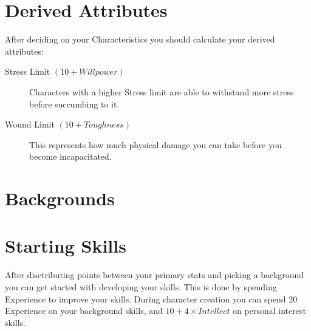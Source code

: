 
\section{Derived Attributes}

After deciding on your Characteristics you should calculate your derived attributes:

\begin{description}
    \item[Stress Limit $(10 + Willpower)$] 
    Characters with a higher Stress limit are able to withstand more stress before succumbing to it.
    \item[Wound Limit $(10 + Toughness)$] 
    This represents how much physical damage you can take before you become incapacitated.
\end{description}



\section{Backgrounds}

\section{Starting Skills}
After disctributing points between your primary stats and picking a background
you can get started with developing your skills. This is done by spending Experience to improve your skills. 
During character creation you can spend 20 Experience on your background skills,
and $10 + 4 \times Intellect$ on personal interest skills. 

